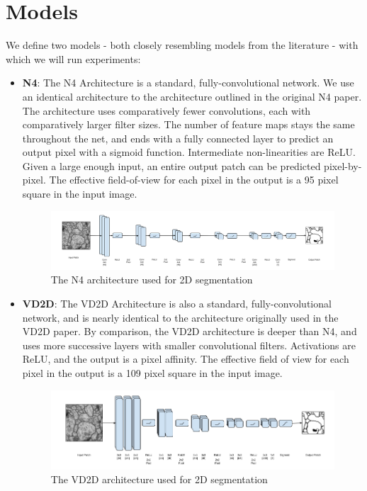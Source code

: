 \section{Models}

We define two models - both closely resembling models from the literature -  with which we will run experiments:

\begin{itemize}
\item \textbf{N4}: The N4 Architecture is a standard, fully-convolutional network. We use an identical architecture to the architecture outlined in the original N4 paper\cite{Cirean}. The architecture uses comparatively fewer convolutions, each with comparatively larger filter sizes. The number of feature maps stays the same throughout the net, and ends with a fully connected layer to predict an output pixel with a sigmoid function. Intermediate non-linearities are ReLU. Given a large enough input, an entire output patch can be predicted pixel-by-pixel. The effective field-of-view for each pixel in the output is a 95 pixel square in the input image.

\begin{figure}[h]
\centering
\includegraphics[width=\textwidth]{img/N4.png}
\caption{The N4 architecture used for 2D segmentation}
\label{fig:n4}
\end{figure}

\item \textbf{VD2D}: The VD2D Architecture is also a standard, fully-convolutional network, and is nearly identical to the architecture originally used in the VD2D paper\cite{Lee}. By comparison, the VD2D architecture is deeper than N4, and uses more successive layers with smaller convolutional filters. Activations are ReLU, and the output is a pixel affinity. The effective field of view for each pixel in the output is a 109 pixel square in the input image.

\begin{figure}[h]
\centering
\includegraphics[width=\textwidth]{img/VD2D.png}
\caption{The VD2D architecture used for 2D segmentation}
\label{fig:vd2d}
\end{figure}

\end{itemize}


